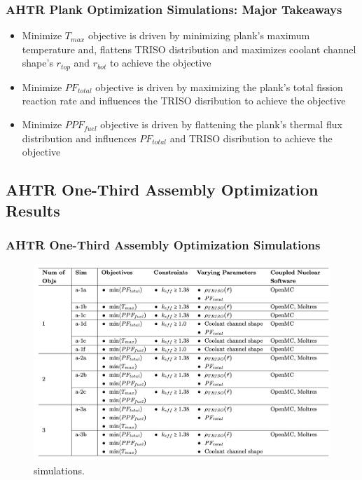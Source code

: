 \begin{frame}
    \frametitle{AHTR Plank Optimization Simulations: Major Takeaways}
    \begin{itemize}
        \item Minimize $T_{max}$ objective is driven by minimizing plank's maximum 
        temperature and, flattens TRISO distribution and maximizes coolant channel 
        shape's $r_{top}$ and $r_{bot}$ to achieve the objective
        \item Minimize $PF_{total}$ objective is driven by maximizing the plank's 
        total fission reaction rate and influences the TRISO disribution to achieve 
        the objective
        \item Minimize $PPF_{fuel}$ objective is driven by flattening the plank's 
        thermal flux distribution and influences $PF_{total}$ and TRISO disribution to 
        achieve the objective
    \end{itemize}
\end{frame}

\subsection{AHTR One-Third Assembly Optimization Results}
\begin{frame}
    \frametitle{AHTR One-Third Assembly Optimization Simulations}
    \begin{figure}
        \includegraphics[width=0.95\linewidth]{figures/ahtr-assem-opt-table.png} 
        \caption{simulations.}
    \end{figure}
\end{frame}

